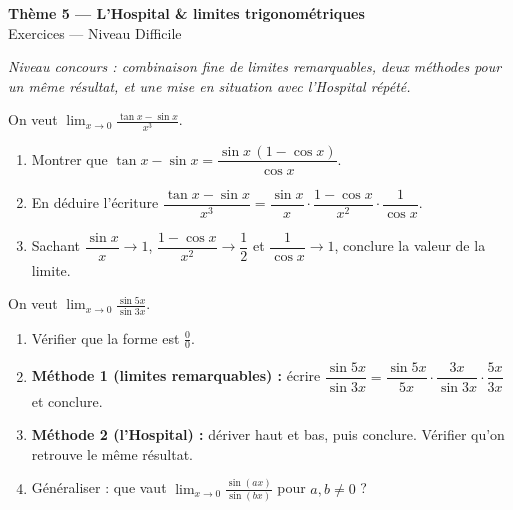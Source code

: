 \documentclass[11pt,a4paper]{article}
\begin{document}
\begin{center}
{\Large\bfseries\color{primarydark}Thème 5 — L'Hospital \& limites trigonométriques}\\[2pt]
{\large\color{primary}Exercices — Niveau Difficile}
\end{center}
\vspace{4pt}
{\small\itshape Niveau concours : combinaison fine de limites remarquables, deux méthodes pour un même
résultat, et une mise en situation avec l'Hospital répété.}
\vspace{6pt}

\begin{exercice}
On veut $\displaystyle\lim_{x\to 0}\frac{\tan x-\sin x}{x^3}$.
\begin{enumerate}[label=\alph*),leftmargin=2em,itemsep=3pt]
  \item Montrer que $\tan x-\sin x=\dfrac{\sin x\,(1-\cos x)}{\cos x}$.
  \item En déduire l'écriture $\dfrac{\tan x-\sin x}{x^3}=\dfrac{\sin x}{x}\cdot\dfrac{1-\cos x}{x^2}\cdot\dfrac{1}{\cos x}$.
  \item Sachant $\dfrac{\sin x}{x}\to 1$, $\dfrac{1-\cos x}{x^2}\to\dfrac12$ et $\dfrac{1}{\cos x}\to 1$,
        conclure la valeur de la limite.
\end{enumerate}
\end{exercice}

\begin{exercice}
On veut $\displaystyle\lim_{x\to 0}\frac{\sin 5x}{\sin 3x}$.
\begin{enumerate}[label=\alph*),leftmargin=2em,itemsep=3pt]
  \item Vérifier que la forme est $\frac00$.
  \item \textbf{Méthode 1 (limites remarquables) :} écrire
        $\dfrac{\sin 5x}{\sin 3x}=\dfrac{\sin 5x}{5x}\cdot\dfrac{3x}{\sin 3x}\cdot\dfrac{5x}{3x}$ et conclure.
  \item \textbf{Méthode 2 (l'Hospital) :} dériver haut et bas, puis conclure. Vérifier qu'on retrouve le
        même résultat.
  \item Généraliser : que vaut $\displaystyle\lim_{x\to 0}\frac{\sin(ax)}{\sin(bx)}$ pour $a,b\neq 0$ ?
\end{enumerate}
\end{exercice}
\end{document}
